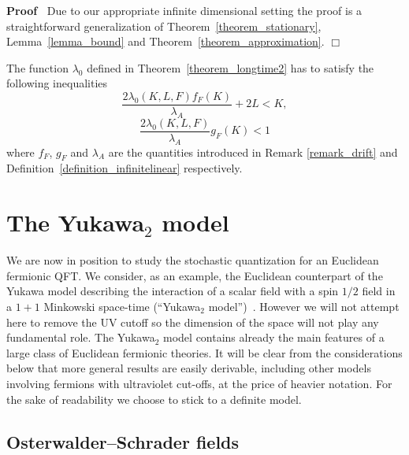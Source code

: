 \documentclass{article}
\newenvironment{proof}{\noindent\textbf{Proof\ }}{\hspace*{\fill}$\Box$\medskip}
\begin{document}
\begin{proof}
  Due to our appropriate infinite dimensional setting the proof is a
  straightforward generalization of Theorem~\ref{theorem_stationary},
  Lemma~\ref{lemma_bound} and Theorem~\ref{theorem_approximation}.
\end{proof}

\begin{remark}
  The function $\lambda_0$ defined in Theorem~\ref{theorem_longtime2} has to
  satisfy the following inequalities
  \begin{equation}
    \frac{2 \lambda_0 (K, L, F) f_F (K)}{\lambda_A} + 2 L < K
    \label{eq:contraction3},
  \end{equation}
  \begin{equation}
    \frac{2 \lambda_0 (K, L, F)}{\lambda_A} g_F (K) < 1
    \label{eq:contraction4}
  \end{equation}
  where $f_F$, $g_F$ and $\lambda_A$ are the quantities introduced in Remark
  \ref{remark_drift} and Definition~\ref{definition_infinitelinear}
  respectively.
\end{remark}

\section{The Yukawa$_2$ model}\label{sec:yukawa}

We are now in position to study the stochastic quantization for an Euclidean
fermionic QFT. We consider, as an example, the Euclidean counterpart of the
Yukawa model describing the interaction of a scalar field with a spin $1 / 2$
field in a $1 + 1$ Minkowski space-time (``Yukawa$_2$
model'')~{\cite{osterwalder_euclidean_1973,cooper_weakly_1977,battle_infinite_1981,lesniewski_effective_1987,summers2012perspective}}.
However we will not attempt here to remove the UV cutoff so the dimension of
the space will not play any fundamental role. The Yukawa$_2$ model contains
already the main features of a large class of Euclidean fermionic theories. It
will be clear from the considerations below that more general results are
easily derivable, including other models involving fermions with ultraviolet
cut-offs, at the price of heavier notation. For the sake of readability we
choose to stick to a definite model.

\subsection{Osterwalder--Schrader fields}\label{sec:os-fields}
\end{document}
